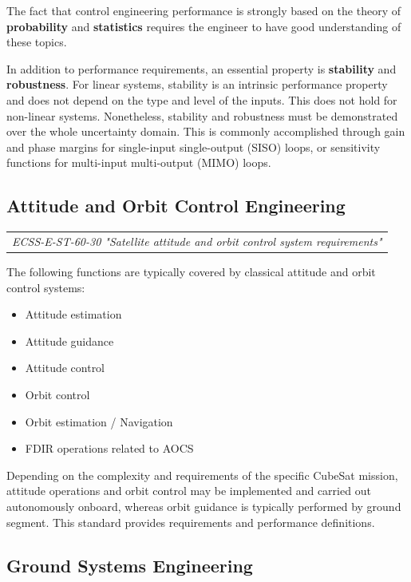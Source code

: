 The fact that control engineering performance is strongly based on the theory of \textbf{probability} and \textbf{statistics} requires the engineer to have good understanding of these topics.

In addition to performance requirements, an essential property is \textbf{stability} and \textbf{robustness}. For linear systems, stability is an intrinsic performance property and does not depend on the type and level of the inputs. This does not hold for non-linear systems. Nonetheless, stability and robustness must be demonstrated over the whole uncertainty domain. This is commonly accomplished through gain and phase margins for single-input single-output (SISO) loops, or sensitivity functions for multi-input multi-output (MIMO) loops.


\subsection{Attitude and Orbit Control Engineering}

\begin{tabular}{l}
\textit{ECSS-E-ST-60-30 "Satellite attitude and orbit control system requirements" \cite{ECSS-E-ST-60-30}}
\end{tabular}

The following functions are typically covered by classical attitude and orbit control systems:

\begin{itemize}
\item Attitude estimation
\item Attitude guidance
\item Attitude control
\item Orbit control
\item Orbit estimation / Navigation
\item FDIR operations related to AOCS
\end{itemize}

Depending on the complexity and requirements of the specific CubeSat mission, attitude operations and orbit control may be implemented and carried out autonomously onboard, whereas orbit guidance is typically performed by ground segment. This standard provides requirements and performance definitions.

\subsection{Ground Systems Engineering}


